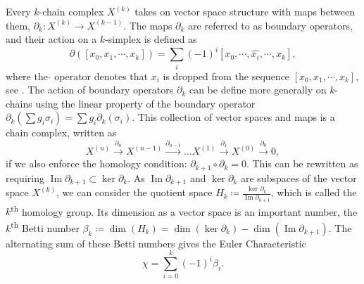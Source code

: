 \documentclass{article}
\newcommand{\ts}{\textsuperscript}
\DeclareMathOperator{\im}{Im}
\begin{document}
Every $k$-chain complex $X^{(k)}$ takes on vector space structure with maps between them, $\partial_k : X^{(k)} \to X^{(k - 1)}$. The maps $ \partial_k $ are referred to as boundary operators, and their action on a $ k $-simplex is defined as
\begin{equation}
\partial([x_0, x_1, \cdots, x_k]) = \sum_i (-1)^i [x_0, \cdots, \hat{x_i}, \cdots, x_k],
\end{equation}
where the $ \hat{} $ operator denotes that $ x_i $ is dropped from the sequence $ [x_0, x_1, \cdots, x_k] $, see \cite{Hatcher:478079}. The action of boundary operators $\partial_k$ can be define more generally on $k$-chains using the linear property of the boundary operator $\partial_k(\sum g_i \sigma_i ) = \sum g_i \partial_k(\sigma_i )$.
This collection of vector spaces and maps is a chain complex, written as
\begin{equation}
    X^{(n)} \xrightarrow{\partial_n} X^{(n-1)} \xrightarrow{\partial_{n-1}} \ldots X^{(1)} \xrightarrow{\partial_1} X^{(0)} \xrightarrow{\partial_0} 0,
\end{equation}
if we also enforce the homology condition: $\partial_{k + 1} \circ \partial_{k} = 0$. This can be rewritten as requiring $\im \partial_{k + 1} \subset \ker \partial_{k}$. As $\im \partial_{k + 1}$ and $\ker \partial_{k}$ are subspaces of the vector space $X^{(k)}$, we can consider the quotient space $ H_{k} \coloneqq  \frac{\ker \partial_{k}}{\im \partial_{k + 1}}$, which is called the $k$\ts{th} homology group. Its dimension as a vector space is an important number, the $k$\ts{th} Betti number $\beta_k \coloneqq \dim(H_k) = \dim(\ker \partial_k) - \dim(\im \partial_{k + 1})$. The alternating sum of these Betti numbers gives the Euler Characteristic 
\begin{equation}
    \chi = \sum_{i = 0}^{k} (-1)^i \beta_i.
\end{equation}
\end{document}
